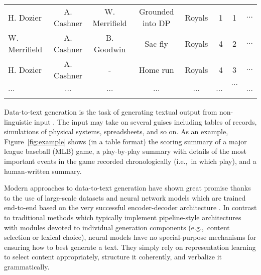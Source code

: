 \documentclass[11pt,a4paper]{article}
\newcommand{\lform}[1]{\textsf{\scriptsize{#1}}}
\begin{document}
\begin{figure*}
\begin{small}
\begin{minipage}{\textwidth}
\begin{tabular}{@{}l@{~~}c@{~~}c@{~~}c@{~~}cr@{~~}c@{~~}l@{}}
\lform{H. Dozier}&\lform{A. Cashner}&\lform{W. Merrifield}&\lform{Grounded into DP}&\lform{Royals} & \lform{1} & \lform{1} & \lform{$\dots$}\\ 
\lform{W. Merrifield}&\lform{A. Cashner}&\lform{B. Goodwin}&\lform{Sac fly}&\lform{Royals} & \lform{4} & \lform{2} & \lform{$\dots$}\\ 
\lform{H. Dozier}&\lform{A. Cashner}&\lform{-}&\lform{Home run}&\lform{Royals} & \lform{4} & \lform{3} & \lform{$\dots$}\\ 
\lform{$\dots$} & \lform{$\dots$} & \lform{$\dots$} & \lform{$\dots$} &  \lform{$\dots$} & \lform{$\dots$} & \lform{$\dots$}\ & \lform{$\dots$}\\\hline
\end{tabular}

\end{minipage}
\end{small}
\caption{MLB statistics tables and game summary. The tables summarize
  the performance of the two teams and of individual team members who
  played as batters and pitchers as well as the most important events
  (and their actors) in each play. Recurring entities in the summary
  are boldfaced and colorcoded, singletons are shown in black. }
\label{fig:example}
\end{figure*}


Data-to-text generation is the task of generating textual output from
non-linguistic input \cite{Reiter:1997:BAN:974487.974490,
  DBLP:journals/jair/GattK18}. The input may take on several guises including
tables of records, simulations of physical systems, spreadsheets, and
so on. As an example, Figure~\ref{fig:example} shows (in a table
format) the scoring summary of a major league baseball (MLB) game, a
play-by-play summary with details of the most important events in the
game recorded chronologically (i.e.,~in which play), and a
 human-written summary.

Modern approaches to data-to-text generation have shown great promise
\cite{D16-1128,N16-1086,
  N18-1137,DBLP:journals/corr/abs-1809-00582,D17-1239}
thanks to the use of large-scale datasets and neural network models
which are trained end-to-end based on the very successful
encoder-decoder architecture \cite{DBLP:journals/corr/BahdanauCB14}. In contrast to
traditional methods which typically implement pipeline-style
architectures \cite{reiter-dale:00} with modules devoted to individual
generation components (e.g.,~content selection or lexical choice),
neural models have no special-purpose mechanisms for ensuring how to
best generate a text. They simply rely on representation learning 
to select content appropriately, structure it coherently, and
verbalize it grammatically.
\end{document}
